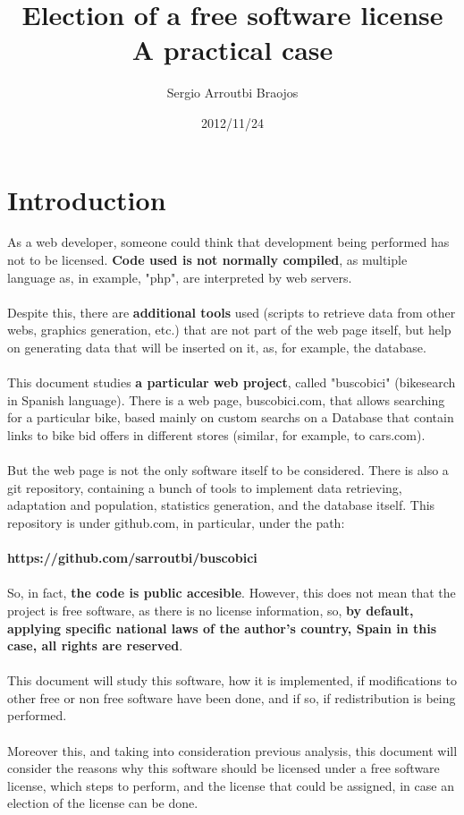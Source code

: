 \documentclass[11pt]{article}
\title{\textbf{Election of a free software license\\ A practical case}}
\author{Sergio Arroutbi Braojos}
\date{2012/11/24}
\begin{document}
\maketitle
\pagebreak
\section{Introduction}

As a web developer, someone could think that development being performed has not to be licensed. \textbf{Code used is not normally compiled}, as multiple language as, in example, "php", are interpreted by web servers. \\
\\
Despite this, there are \textbf{additional tools} used (scripts to retrieve data from other webs, graphics generation, etc.) that are not part of the web page itself, but help on generating data that will be inserted on it, as, for example, the database. \\
\\
This document studies \textbf{a particular web project}, called "buscobici" (bikesearch in Spanish language). There is a web page, buscobici.com, that allows searching for a particular bike, based mainly on custom searchs on a Database that contain links to bike bid offers in different stores (similar, for example, to cars.com). \\
\\
But the web page is not the only software itself to be considered. There is also a git repository, containing a bunch of tools to implement data retrieving, adaptation and population, statistics generation, and the database itself. This repository is under github.com, in particular, under the path: \\
\\
\textbf{https://github.com/sarroutbi/buscobici \\}
\\
So, in fact, \textbf{the code is public accesible}. However, this does not mean that the project is free software, as there is no license information, so, \textbf{by default, applying specific national laws of the author's country, Spain in this case, all rights are reserved}. \\
\\
This document will study this software, how it is implemented, if modifications to other free or non free software have been done, and if so, if redistribution is being performed.\\
\\
Moreover this, and taking into consideration previous analysis, this document will consider the reasons why this software should be licensed under a free software license, which steps to perform, and the license that could be assigned, in case an election of the license can be done. 
\pagebreak
\end{document}
